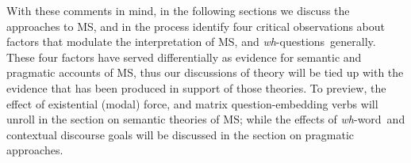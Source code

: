 \documentclass[12pt,letterpaper,table,svgnames,dvipsnames]{article}
\newcommand{\mm}[1]{\textcolor{teal}{[mm: #1]}}
\newcommand{\whqs}{\emph{wh}-questions~}
\newcommand{\whw}{\emph{wh}-word~}
\begin{document}
With these comments in mind, in the following sections we discuss the approaches to MS, and in the process identify four critical observations about factors that modulate the interpretation of MS, and \whqs generally. These four factors have served differentially as evidence for semantic and pragmatic accounts of MS, thus our discussions of theory will be tied up with the evidence that has been produced in support of those theories. To preview, the effect of existential (modal) force, and matrix question-embedding verbs will unroll in the section on semantic theories of MS; while the effects of \whw and contextual discourse goals will be discussed in the section on pragmatic approaches. 






\end{document}
